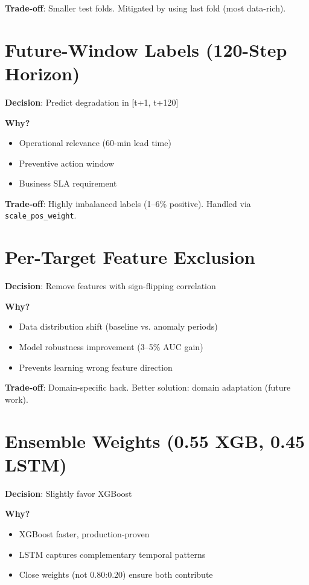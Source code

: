 \documentclass[11pt,a4paper,oneside]{report}
\begin{document}
\textbf{Trade-off}: Smaller test folds. Mitigated by using last fold (most data-rich).

\section{Future-Window Labels (120-Step Horizon)}

\textbf{Decision}: Predict degradation in [t+1, t+120]

\textbf{Why?}
\begin{itemize}
    \item Operational relevance (60-min lead time)
    \item Preventive action window
    \item Business SLA requirement
\end{itemize}

\textbf{Trade-off}: Highly imbalanced labels (1--6\% positive). Handled via \texttt{scale\_pos\_weight}.

\section{Per-Target Feature Exclusion}

\textbf{Decision}: Remove features with sign-flipping correlation

\textbf{Why?}
\begin{itemize}
    \item Data distribution shift (baseline vs. anomaly periods)
    \item Model robustness improvement (3--5\% AUC gain)
    \item Prevents learning wrong feature direction
\end{itemize}

\textbf{Trade-off}: Domain-specific hack. Better solution: domain adaptation (future work).

\section{Ensemble Weights (0.55 XGB, 0.45 LSTM)}

\textbf{Decision}: Slightly favor XGBoost

\textbf{Why?}
\begin{itemize}
    \item XGBoost faster, production-proven
    \item LSTM captures complementary temporal patterns
    \item Close weights (not 0.80:0.20) ensure both contribute
\end{itemize}
\end{document}
